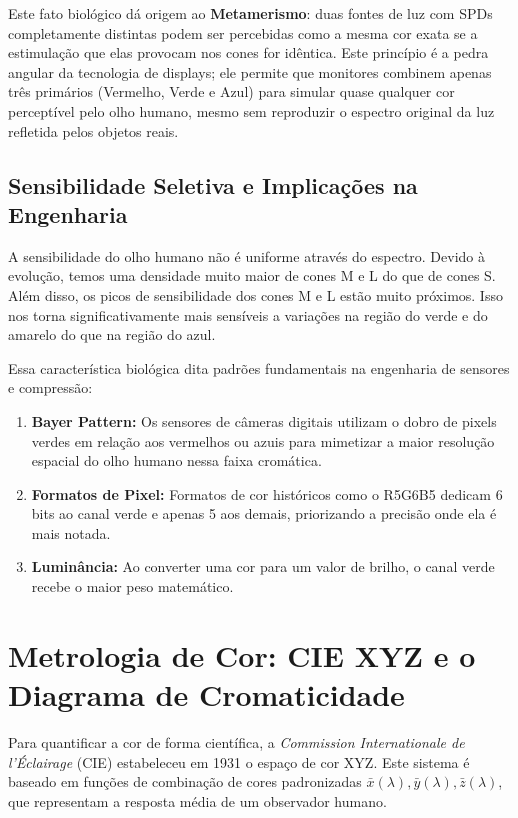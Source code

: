 Este fato biológico dá origem ao \textbf{Metamerismo}: duas fontes de luz com SPDs completamente distintas podem ser percebidas como a mesma cor exata se a estimulação que elas provocam nos cones for idêntica. Este princípio é a pedra angular da tecnologia de displays; ele permite que monitores combinem apenas três primários (Vermelho, Verde e Azul) para simular quase qualquer cor perceptível pelo olho humano, mesmo sem reproduzir o espectro original da luz refletida pelos objetos reais.

\subsection{Sensibilidade Seletiva e Implicações na Engenharia}

A sensibilidade do olho humano não é uniforme através do espectro. Devido à evolução, temos uma densidade muito maior de cones M e L do que de cones S. Além disso, os picos de sensibilidade dos cones M e L estão muito próximos. Isso nos torna significativamente mais sensíveis a variações na região do verde e do amarelo do que na região do azul. 

Essa característica biológica dita padrões fundamentais na engenharia de sensores e compressão:
\begin{enumerate}
    \item \textbf{Bayer Pattern:} Os sensores de câmeras digitais utilizam o dobro de pixels verdes em relação aos vermelhos ou azuis para mimetizar a maior resolução espacial do olho humano nessa faixa cromática.
    \item \textbf{Formatos de Pixel:} Formatos de cor históricos como o R5G6B5 dedicam 6 bits ao canal verde e apenas 5 aos demais, priorizando a precisão onde ela é mais notada.
    \item \textbf{Luminância:} Ao converter uma cor para um valor de brilho, o canal verde recebe o maior peso matemático.
\end{enumerate}

\section{Metrologia de Cor: CIE XYZ e o Diagrama de Cromaticidade}

Para quantificar a cor de forma científica, a \textit{Commission Internationale de l'Éclairage} (CIE) estabeleceu em 1931 o espaço de cor XYZ. Este sistema é baseado em funções de combinação de cores padronizadas $\bar{x}(\lambda), \bar{y}(\lambda), \bar{z}(\lambda)$, que representam a resposta média de um observador humano.

